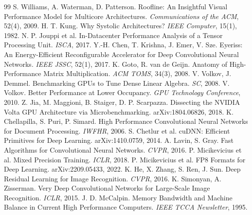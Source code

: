 \documentclass[11pt,a4paper]{ctexart}
\begin{document}
\begin{thebibliography}{99}
 S. Williams, A. Waterman, D. Patterson. Roofline: An Insightful Visual Performance Model for Multicore Architectures. \emph{Communications of the ACM}, 52(4), 2009.
 H. T. Kung. Why Systolic Architectures? \emph{IEEE Computer}, 15(1), 1982.
 N. P. Jouppi et al. In-Datacenter Performance Analysis of a Tensor Processing Unit. \emph{ISCA}, 2017.
 Y.-H. Chen, T. Krishna, J. Emer, V. Sze. Eyeriss: An Energy-Efficient Reconfigurable Accelerator for Deep Convolutional Neural Networks. \emph{IEEE JSSC}, 52(1), 2017.
 K. Goto, R. van de Geijn. Anatomy of High-Performance Matrix Multiplication. \emph{ACM TOMS}, 34(3), 2008.
 V. Volkov, J. Demmel. Benchmarking GPUs to Tune Dense Linear Algebra. \emph{SC}, 2008.
 V. Volkov. Better Performance at Lower Occupancy. \emph{GPU Technology Conference}, 2010.
 Z. Jia, M. Maggioni, B. Staiger, D. P. Scarpazza. Dissecting the NVIDIA Volta GPU Architecture via Microbenchmarking. arXiv:1804.06826, 2018.
 K. Chellapilla, S. Puri, P. Simard. High Performance Convolutional Neural Networks for Document Processing. \emph{IWFHR}, 2006.
 S. Chetlur et al. cuDNN: Efficient Primitives for Deep Learning. arXiv:1410.0759, 2014.
 A. Lavin, S. Gray. Fast Algorithms for Convolutional Neural Networks. \emph{CVPR}, 2016.
 P. Micikevicius et al. Mixed Precision Training. \emph{ICLR}, 2018.
 P. Micikevicius et al. FP8 Formats for Deep Learning. arXiv:2209.05433, 2022.
 K. He, X. Zhang, S. Ren, J. Sun. Deep Residual Learning for Image Recognition. \emph{CVPR}, 2016.
 K. Simonyan, A. Zisserman. Very Deep Convolutional Networks for Large-Scale Image Recognition. \emph{ICLR}, 2015.
 J. D. McCalpin. Memory Bandwidth and Machine Balance in Current High Performance Computers. \emph{IEEE TCCA Newsletter}, 1995.
\end{thebibliography}
\end{document}
